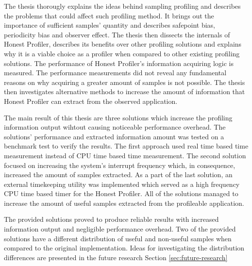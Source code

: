 \documentclass[..thesis.tex]{subfiles}
\begin{document}
The thesis thorougly explains the ideas behind sampling profiling and describes the problems that could affect such profiling method. It brings out the importance of sufficient samples' quantity and describes safepoint bias, periodicity bias and observer effect. The thesis then dissects the internals of Honest Profiler, describes its benefits over other profiling solutions and explains why it is a viable choice as a profiler when compared to other existing profiling solutions. The performance of Honest Profiler's information acquiring logic is measured. The performance measurements did not reveal any fundamental reasons on why acquiring a greater amount of samples is not possible. The thesis then investigates alternative methods to increase the amount of information that Honest Profiler can extract from the observed application.


The main result of this thesis are three solutions which increase the profiling information output wihtout causing noticeable performance overhead. The solutions' performance and extracted information amount was tested on a benchmark test to verify the results. The first approach used real time based time measurement instead of CPU time based time measurement. The second solution focused on increasing the system's interrupt frequency which, in consequence, increased the amount of samples extracted. As a part of the last solution, an external timekeeping utility was implemented which served as a high frequency CPU time based timer for the Honest Profiler. All of the solutions managed to increase the amount of useful samples extracted from the profileable application.

The provided solutions proved to produce reliable results with increased information output and negligible performance overhead. Two of the provided solutions have a different distribution of useful and non-useful samples when compared to the original implementation. Ideas for investigating the distribution differences are presented in the future research Section \ref{sec:future-research}
\end{document}
